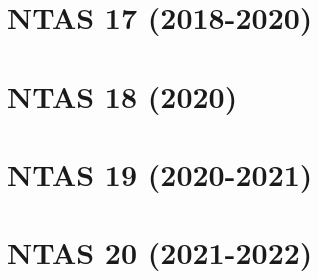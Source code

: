 \documentclass[12pt]{report}
\begin{document}
\chapter{NTAS 17 (2018-2020)}



\chapter{NTAS 18 (2020)}



\chapter{NTAS 19 (2020-2021)}



\chapter{NTAS 20 (2021-2022)}


\end{document}
